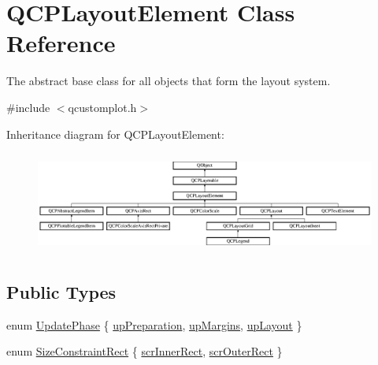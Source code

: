 \hypertarget{class_q_c_p_layout_element}{}\section{Q\+C\+P\+Layout\+Element Class Reference}
\label{class_q_c_p_layout_element}


The abstract base class for all objects that form the layout system.  




{\ttfamily \#include $<$qcustomplot.\+h$>$}

Inheritance diagram for Q\+C\+P\+Layout\+Element\+:\begin{figure}[H]
\begin{center}
\leavevmode
\includegraphics[height=3.376884cm]{d5/db3/class_q_c_p_layout_element}
\end{center}
\end{figure}
\subsection*{Public Types}
\begin{DoxyCompactItemize}
\item 
enum \mbox{\hyperlink{class_q_c_p_layout_element_a0d83360e05735735aaf6d7983c56374d}{Update\+Phase}} \{ \mbox{\hyperlink{class_q_c_p_layout_element_a0d83360e05735735aaf6d7983c56374dad6119882eba136357c2f627992e527d3}{up\+Preparation}}, 
\mbox{\hyperlink{class_q_c_p_layout_element_a0d83360e05735735aaf6d7983c56374da288cb59a92280e47261a341f2813e676}{up\+Margins}}, 
\mbox{\hyperlink{class_q_c_p_layout_element_a0d83360e05735735aaf6d7983c56374da5d1ccf5d79967c232c3c511796860045}{up\+Layout}}
 \}
\item 
enum \mbox{\hyperlink{class_q_c_p_layout_element_a0afb3e5773529e4bd20e448f81be4d2a}{Size\+Constraint\+Rect}} \{ \mbox{\hyperlink{class_q_c_p_layout_element_a0afb3e5773529e4bd20e448f81be4d2aa7fa7e25cd23758b9915c64ed9f1be26c}{scr\+Inner\+Rect}}, 
\mbox{\hyperlink{class_q_c_p_layout_element_a0afb3e5773529e4bd20e448f81be4d2aabe2745b41a6131ed194e13591b08e04d}{scr\+Outer\+Rect}}
 \}
\end{DoxyCompactItemize}
